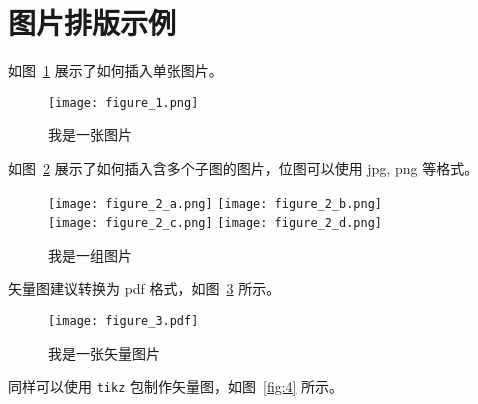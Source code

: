 \section{图片排版示例}
\label{sec:intro:figure}
如图~\ref{fig:1} 展示了如何插入单张图片。
\begin{figure}[ht] %
    \centering \texttt{[image: figure\_1.png]}
    \caption{我是一张图片} \label{fig:1}
\end{figure}
如图~\ref{fig:2} 展示了如何插入含多个子图的图片，位图可以使用 jpg, png 等格式。
\begin{figure}[ht] \centering
      {\texttt{[image: figure\_2\_a.png]}} \hspace{2em} %
      {\texttt{[image: figure\_2\_b.png]}} \\ \vspace{1em} %
      {\texttt{[image: figure\_2\_c.png]}} \hspace{2em} %
      {\texttt{[image: figure\_2\_d.png]}}
    \caption{我是一组图片} \label{fig:2}
\end{figure}
矢量图建议转换为 pdf 格式，如图~\ref{fig:3} 所示。
\begin{figure}[ht] \centering
    \texttt{[image: figure\_3.pdf]}
    \caption{我是一张矢量图片} \label{fig:3}
\end{figure}
同样可以使用 \verb|tikz| 包制作矢量图，如图~\ref{fig:4} 所示。

